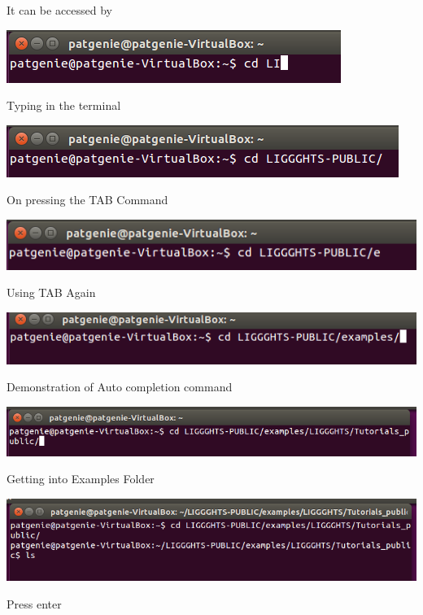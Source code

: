 \documentclass{tufte-book} %
\begin{document}
 It can be accessed by
\begin{marginfigure}
  \includegraphics[width=\linewidth]{graphics/Screenshot/Lig2.png}
\caption{Typing in the terminal}
  \includegraphics[width=\linewidth]{graphics/Screenshot/Lig3.png}
\caption{On pressing the TAB Command}
  \includegraphics[width=\linewidth]{graphics/Screenshot/Lig4.png}
  \caption{Using TAB Again }
  \includegraphics[width=\linewidth]{graphics/Screenshot/Lig5.png}
  \caption{Demonstration of Auto completion command}
  \includegraphics[width=\linewidth]{graphics/Screenshot/Lig6.png}
  \caption{Getting into Examples Folder}
  \includegraphics[width=\linewidth]{graphics/Screenshot/Lig7.png}
  \caption{Press enter}
 
  \label{fig:lig1}
\end{marginfigure}
\end{document}
